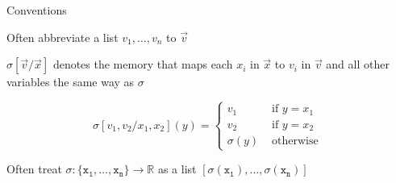 \documentclass{beamer}
\begin{document}
\begin{frame}{Conventions}

        Often abbreviate a list $v_1,\dots,v_n$ to $\vec{v}$

        $\sigma[\vec{v}/\vec{x}]$ denotes the memory that maps
        each $x_i$ in $\vec{x}$ to $v_i$ in $\vec{v}$ and all other
        variables the same way as $\sigma$

        \begin{example}
                \[
                        \sigma[v_1,v_2/x_1,x_2](y) = \begin{cases}
                                v_1 & \text{ if } y = x_1 \\
                                v_2 & \text{ if } y = x_2 \\
                                \sigma(y) & \text{ otherwise }
                        \end{cases}
                \]
        \end{example}

        Often treat $\sigma : \{ \mathtt{x_1}, \dots, \mathtt{x_n} \} \to
        \mathbb{R}$ as a list $[\sigma(\mathtt{x_1}), \dots,
        \sigma(\mathtt{x_n})]$
\end{frame}
\end{document}
